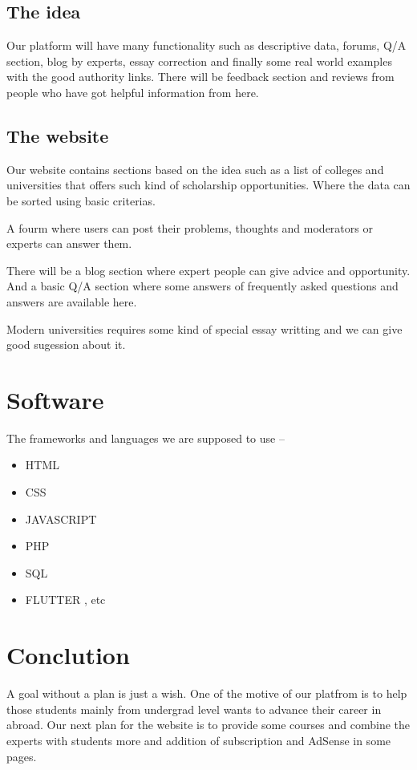 \documentclass[a4paper,12pt]{report}
\begin{document}
\subsection*{The idea}
Our platform will have many functionality such as descriptive data, forums, Q/A section, blog by experts, essay correction and finally some real world examples with the good authority links. There will be feedback section and reviews from people who have got helpful information from here.

\subsection*{The website}
Our website contains sections based on the idea such as a list of colleges and universities that offers such kind of scholarship opportunities. Where the data can be sorted using basic criterias.

A fourm where users can post their problems, thoughts and moderators or experts can answer them.

There will be a blog section where expert people can give advice and opportunity. And a basic Q/A section where some answers of frequently asked questions and answers are available here.

Modern universities requires some kind of special essay writting and we can give good sugession about it.


\section*{Software}
The frameworks and languages we are supposed to use --
\begin{itemize}
	\item HTML
	\item CSS
	\item JAVASCRIPT
	\item PHP
	\item SQL
	\item FLUTTER , etc
\end{itemize}

\section*{Conclution}
A goal without a plan is just a wish. One of the motive of our platfrom is to help those students mainly from undergrad level  wants to advance their career in abroad. Our next plan for the website is to provide some courses and combine the experts with students more and addition of subscription and AdSense in some pages.
\end{document}
